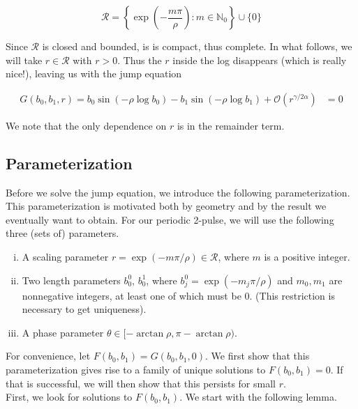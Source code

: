 \documentclass[12pt]{article}
\def\N{{\mathbb N}}
\begin{document}
\begin{equation}\label{setR}
\mathcal{R} = \left\{ \exp\left(-\frac{m \pi}{\rho}\right) : m \in \N_0 \right\} \cup \{ 0 \}
\end{equation}

Since $\mathcal{R}$ is closed and bounded, is is compact, thus complete. In what follows, we will take $r \in \mathcal{R}$ with $r > 0$. Thus the $r$ inside the log disappears (which is really nice!), leaving us with the jump equation

\begin{align}\label{jumpcond3}
G(b_0, b_1,r) =
b_0 \sin(-\rho \log b_0 ) - b_1 \sin(-\rho \log b_1 ) + \mathcal{O}(r^{\gamma / 2 \alpha}) &= 0
\end{align}

We note that the only dependence on $r$ is in the remainder term.

\subsection{Parameterization}

Before we solve the jump equation, we introduce the following parameterization. This parameterization is motivated both by geometry and by the result we eventually want to obtain. For our periodic 2-pulse, we will use the following three (sets of) parameters.

\begin{enumerate}[(i)]
\item A scaling parameter $r = \exp(-m \pi / \rho ) \in \mathcal{R}$, where $m$ is a positive integer.
\item Two length parameters $b_0^0$, $b_0^1$, where $b_j^0 = \exp(-m_j \pi / \rho )$ and $m_0, m_1$ are nonnegative integers, at least one of which must be 0. (This restriction is necessary to get uniqueness).
\item A phase parameter $\theta \in [-\arctan \rho, \pi - \arctan \rho)$.
\end{enumerate}

For convenience, let $F(b_0, b_1) = G(b_0, b_1, 0)$. We first show that this parameterization gives rise to a family of unique solutions to $F(b_0, b_1) = 0$. If that is successful, we will then show that this persists for small $r$.\\

First, we look for solutions to $F(b_0, b_1)$. We start with the following lemma.
\end{document}
